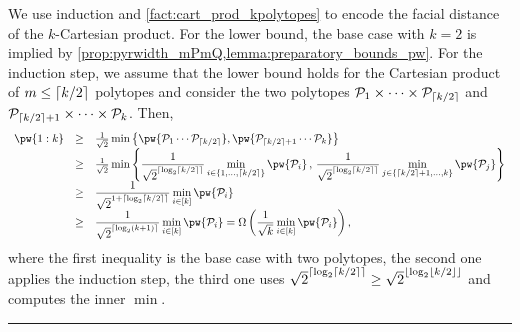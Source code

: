 \documentclass{article}
\newcommand{\bigomegal}[1]{\Omega\left( #1 \right)}
\newcommand{\jmlrBlackBox}{\rule{1.5ex}{1.5ex}}
\newcommand{\jmlrQED}{\hfill\jmlrBlackBox\par\bigskip}
\providecommand{\proofname}{Proof}
\renewenvironment{proof}%
{%
 \par\noindent{\bfseries\upshape \proofname\ }%
}%
{\jmlrQED}
\newcommand{\mP}{\mathcal{P}}
\DeclarePairedDelimiter\ceil{\lceil}{\rceil}
\DeclarePairedDelimiter\floor{\lfloor}{\rfloor}
\begin{document}
\begin{proof}
We use induction and \cref{fact:cart_prod_kpolytopes} %
to encode the facial distance of the $k$-Cartesian product.
For the lower bound, the base case with $k=2$ is implied by \cref{prop:pyrwidth_mPmQ,lemma:preparatory_bounds_pw}.
For the induction step, we assume that the lower bound holds for the Cartesian product of $m \le \ceil{k/2}$ polytopes and consider the two polytopes $\mP_1 \times \cdots \times \mP_{\ceil{k/2}}$ and $\mP_{\ceil{k/2}+1} \times \cdots \times \mP_k$.
Then,
\[
\begin{array}{rcl}
\pw{1:k} &\ge& \frac{1}{\sqrt{2}}\min\left\{\pw{\mP_1\cdots\mP_{\ceil{k/2}}}, \pw{\mP_{\ceil{k/2}+1}\cdots \mP_k}\right\}\\
%
&\ge&
%
\frac{1}{\sqrt{2}} \displaystyle\min \left\{
\frac{1}{\sqrt{2}^{\ceil{\log_2 \ceil{k/2}}}}\min_{i \in \left\{1, \dots, \ceil{k/2}\right\}} \pw{\mP_i}\,,\,
%
\frac{1}{\sqrt{2}^{\ceil{\log_2 \ceil{k/2}}}}\min_{j \in \left\{\ceil{k/2}+1, \dots, k\right\}} \pw{\mP_j}
\right\}\\
%
&\ge&
\displaystyle \frac{1}{\sqrt{2}^{1 + \ceil{\log_2 \ceil{k/2}}}}
\min_{i \in [k]} \pw{\mP_i}\\
%
&\geq&
%
\displaystyle \frac{1}{\sqrt{2}^{\ceil{\log_2 (k+1)}}}
    \min_{i \in [k]} \pw{\mP_i} = \bigomegal{\frac{1}{\sqrt{k}} \min_{i \in [k]} \pw{\mP_i}},
\end{array}
\]
where the first inequality is the base case with two polytopes, the second one applies the induction step, the third one uses $\sqrt{2}^{\ceil{\log_2 \ceil{k/2}}} \ge \sqrt{2}^{\floor{\log_2 \floor{k/2}}}$ and computes the inner $\min$.

\end{proof}

\end{document}
